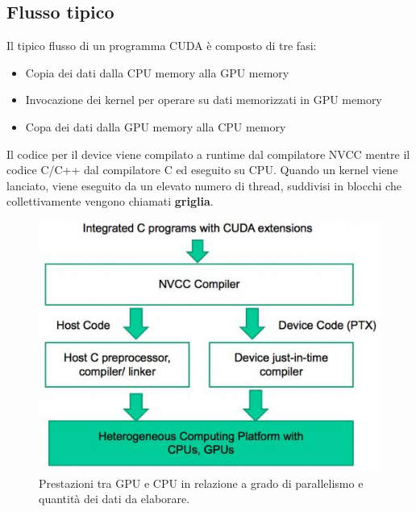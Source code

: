 \subsection{Flusso tipico}
Il tipico flusso di un programma CUDA è composto di tre fasi:
\begin{itemize}
\item Copia dei dati dalla CPU memory alla GPU memory
\item Invocazione dei kernel per operare su dati memorizzati in GPU memory
\item Copa dei dati dalla GPU memory alla CPU memory

\end{itemize}



Il codice per il device viene compilato a runtime dal compilatore NVCC mentre il codice C/C++ dal compilatore C ed eseguito su CPU. Quando un kernel viene lanciato, viene eseguito da un elevato numero di thread, suddivisi in blocchi che collettivamente vengono chiamati \textbf{griglia}.


\begin{figure}[H]
\centering
\includegraphics[scale=0.6]{img/nvcc}
\caption{Prestazioni tra GPU e CPU in relazione a grado di parallelismo e quantità dei dati da elaborare.}
\end{figure}

